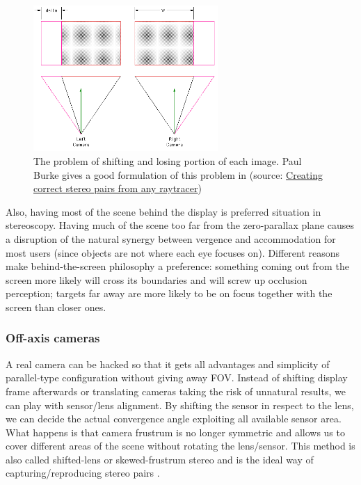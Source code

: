 \begin{figure}
\centering
\includegraphics[width=7cm]{schemas/parallel}
\caption{The problem of shifting and losing portion of each image. Paul Burke gives a good formulation of this problem in \cite{correct_stereo_pairs} (source: \href{http://klee.cittastudi.di.unimi.it/~dan/PGL/doc/articoli&libri/CalculatingStereoPairs.pdf} {Creating correct stereo pairs from any raytracer})}
\label{fig:parallel_cameras}
\end{figure}

Also, having most of the scene behind the display is preferred situation in stereoscopy. Having much of the scene too far from the zero-parallax plane causes a disruption of the natural synergy between vergence and accommodation for most users (since objects are not where each eye focuses on). Different reasons make behind-the-screen philosophy a preference: something coming out from the screen more likely will cross its boundaries and will screw up occlusion perception; targets far away are more likely to be on focus together with the screen than closer ones.

\subsubsection{Off-axis cameras}
A real camera can be hacked so that it gets all advantages and simplicity of parallel-type configuration without giving away FOV. Instead of shifting display frame afterwards or translating cameras taking the risk of unnatural results, we can play with sensor/lens alignment. By shifting the sensor in respect to the lens, we can decide the actual convergence angle exploiting all available sensor area. What happens is that camera frustrum is no longer symmetric and allows us to cover different areas of the scene without rotating the lens/sensor. This method is also called shifted-lens or skewed-frustrum stereo and is the ideal way of capturing/reproducing stereo pairs \cite{offaxis_frustrums}.

